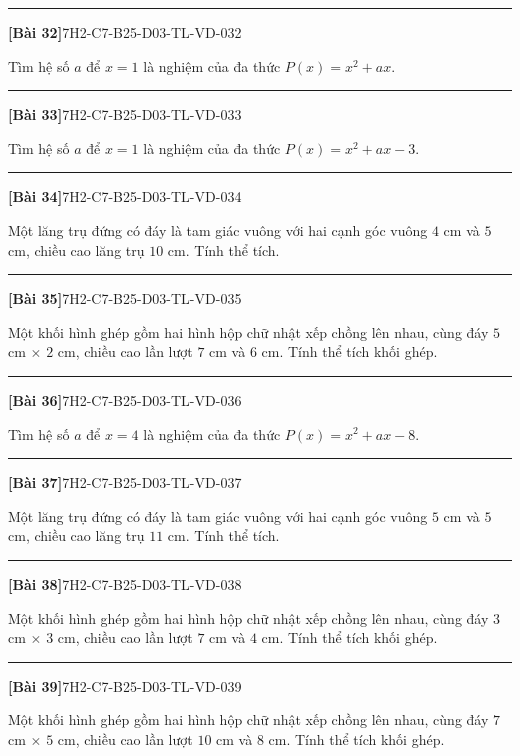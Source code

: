 \documentclass[12pt,a4paper]{article}
\newif\ifloigiai
\newenvironment{cauhoi}[2]{%
  \par\medskip\noindent\rule{\textwidth}{0.4pt}\par\nopagebreak
  \noindent\textbf{[#1]}\hfill{\scriptsize\ttfamily #2}\par\nopagebreak\smallskip}{\par}
\newcommand{\loigiai}[1]{\ifloigiai\par\smallskip\noindent\textit{Lời giải.} #1\par\fi}
\begin{document}
\begin{cauhoi}{Bài 32}{7H2-C7-B25-D03-TL-VD-032}
Tìm hệ số $a$ để $x=1$ là nghiệm của đa thức $P(x)=x^{2}+ax$.
\loigiai{$x=1$ là nghiệm nên $P(1)=0$: $1+1\cdot a=0$ nên $a=-1$, suy ra $a=-1$.}
\end{cauhoi}
\begin{cauhoi}{Bài 33}{7H2-C7-B25-D03-TL-VD-033}
Tìm hệ số $a$ để $x=1$ là nghiệm của đa thức $P(x)=x^{2}+ax-3$.
\loigiai{$x=1$ là nghiệm nên $P(1)=0$: $1+1\cdot a-3=0$ nên $a=2$, suy ra $a=2$.}
\end{cauhoi}
\begin{cauhoi}{Bài 34}{7H2-C7-B25-D03-TL-VD-034}
Một lăng trụ đứng có đáy là tam giác vuông với hai cạnh góc vuông $4$ cm và $5$ cm, chiều cao lăng trụ $10$ cm. Tính thể tích.
\loigiai{Diện tích đáy là $\dfrac{4\cdot 5}{2}=10$ ($\text{cm}^2$). Thể tích là $10\cdot 10=100$ ($\text{cm}^3$).}
\end{cauhoi}
\begin{cauhoi}{Bài 35}{7H2-C7-B25-D03-TL-VD-035}
Một khối hình ghép gồm hai hình hộp chữ nhật xếp chồng lên nhau, cùng đáy $5$ cm $\times$ $2$ cm, chiều cao lần lượt $7$ cm và $6$ cm. Tính thể tích khối ghép.
\loigiai{Thể tích hai khối là $5\cdot 2\cdot 7=70$ và $5\cdot 2\cdot 6=60$ ($\text{cm}^3$). Thể tích khối ghép là $70+60=130$ ($\text{cm}^3$).}
\end{cauhoi}
\begin{cauhoi}{Bài 36}{7H2-C7-B25-D03-TL-VD-036}
Tìm hệ số $a$ để $x=4$ là nghiệm của đa thức $P(x)=x^{2}+ax-8$.
\loigiai{$x=4$ là nghiệm nên $P(4)=0$: $16+4\cdot a-8=0$ nên $4a=-8$, suy ra $a=-2$.}
\end{cauhoi}
\begin{cauhoi}{Bài 37}{7H2-C7-B25-D03-TL-VD-037}
Một lăng trụ đứng có đáy là tam giác vuông với hai cạnh góc vuông $5$ cm và $5$ cm, chiều cao lăng trụ $11$ cm. Tính thể tích.
\loigiai{Diện tích đáy là $\dfrac{5\cdot 5}{2}=12,5$ ($\text{cm}^2$). Thể tích là $12,5\cdot 11=137,5$ ($\text{cm}^3$).}
\end{cauhoi}
\begin{cauhoi}{Bài 38}{7H2-C7-B25-D03-TL-VD-038}
Một khối hình ghép gồm hai hình hộp chữ nhật xếp chồng lên nhau, cùng đáy $3$ cm $\times$ $3$ cm, chiều cao lần lượt $7$ cm và $4$ cm. Tính thể tích khối ghép.
\loigiai{Thể tích hai khối là $3\cdot 3\cdot 7=63$ và $3\cdot 3\cdot 4=36$ ($\text{cm}^3$). Thể tích khối ghép là $63+36=99$ ($\text{cm}^3$).}
\end{cauhoi}
\begin{cauhoi}{Bài 39}{7H2-C7-B25-D03-TL-VD-039}
Một khối hình ghép gồm hai hình hộp chữ nhật xếp chồng lên nhau, cùng đáy $7$ cm $\times$ $5$ cm, chiều cao lần lượt $10$ cm và $8$ cm. Tính thể tích khối ghép.
\loigiai{Thể tích hai khối là $7\cdot 5\cdot 10=350$ và $7\cdot 5\cdot 8=280$ ($\text{cm}^3$). Thể tích khối ghép là $350+280=630$ ($\text{cm}^3$).}
\end{cauhoi}
\end{document}
